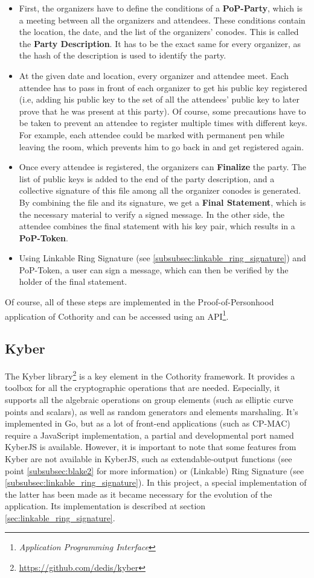 \begin{itemize}
	\item First, the organizers have to define the conditions of a \textbf{PoP-Party}, which is a meeting between all the organizers and attendees. These conditions contain the location, the date, and the list of the organizers' conodes. This is called the \textbf{Party Description}. It has to be the exact same for every organizer, as the hash of the description is used to identify the party.
	\item At the given date and location, every organizer and attendee meet. Each attendee has to pass in front of each organizer to get his public key registered (i.e, adding his public key to the set of all the attendees' public key to later prove that he was present at this party). Of course, some precautions have to be taken to prevent an attendee to register multiple times with different keys. For example, each attendee could be marked with permanent pen while leaving the room, which prevents him to go back in and get registered again.
	\item Once every attendee is registered, the organizers can \textbf{Finalize} the party. The list of public keys is added to the end of the party description, and a collective signature of this file among all the organizer conodes is generated. By combining the file and its signature, we get a \textbf{Final Statement}, which is the necessary material to verify a signed message. In the other side, the attendee combines the final statement with his key pair, which results in a \textbf{PoP-Token}.
	\item Using Linkable Ring Signature (see \ref{subsubsec:linkable_ring_signature}) and PoP-Token, a user can sign a message, which can then be verified by the holder of the final statement.
\end{itemize}

Of course, all of these steps are implemented in the Proof-of-Personhood application of Cothority and can be accessed using an API\footnote{\textit{Application Programming Interface}}.

\subsection{Kyber}
The Kyber library\footnote{\url{https://github.com/dedis/kyber}} is a key element in the Cothority framework. It provides a toolbox for all the cryptographic operations that are needed. Especially, it supports all the algebraic operations on group elements (such as elliptic curve points and scalars), as well as random generators and elements mar\-shaling. It's implemented in Go, but as a lot of front-end applications (such as CP-MAC) require a JavaScript implementation, a partial and develop\-mental port named KyberJS is available. However, it is important to note that some features from Kyber are not available in KyberJS, such as extendable-output functions (see point \ref{subsubsec:blake2} for more information) or (Linkable) Ring Signature (see \ref{subsubsec:linkable_ring_signature}). In this project, a special implementation of the latter has been made as it became necessary for the evolution of the application. Its implementation is described at section \ref{sec:linkable_ring_signature}.
